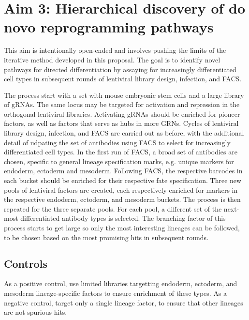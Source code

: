\documentclass[10pt]{article}
\begin{document}


\section{Aim 3: Hierarchical discovery of do novo reprogramming pathways}

This aim is intentionally open-ended and involves pushing the limits of the iterative method developed in this proposal. The goal is to identify novel pathways for directed differentiation by assaying for increasingly differentiated cell types in subsequent rounds of lentiviral library design, infection, and FACS.

The process start with a set with mouse embryonic stem cells and a large library of gRNAs. The same locus may be targeted for activation and repression in the orthogonal lentiviral libraries. Activating gRNAs should be enriched for pioneer factors, as well as factors that serve as hubs in more GRNs. Cycles of lentiviral library design, infection, and FACS are carried out as before, with the additional detail of udpating the set of antibodies using FACS to select for increasingly differentiated cell types. In the first run of FACS, a broad set of antibodies are chosen, specific to general lineage specification marks, e.g. unique markers for endoderm, ectoderm and mesoderm. Following FACS, the respective barcodes in each bucket should be enriched for their respective fate specification. Three new pools of lentiviral factors are created, each respectively enriched for markers in the respective endoderm, ectoderm, and mesoderm buckets. The process is then repeated for the three separate pools. For each pool, a different set of the next-most differentiated antibody types is selected. The branching factor of this process starts to get large so only the most interesting lineages can be followed, to be chosen based on the most promising hits in subsequent rounds.

\subsection{Controls}

As a positive control, use limited libraries targetting endoderm, ectoderm, and mesoderm lineage-specific factors to ensure enrichment of these types. As a negative control, target only a single lineage factor, to ensure that other lineages are not spurious hits.
\end{document}
